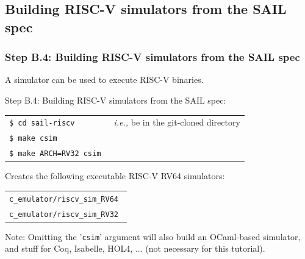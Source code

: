\documentclass[aspectratio=169]{beamer}
\newcommand{\hmmm}{\hspace*{3em}}
\begin{document}

\subsection{Building RISC-V simulators from the SAIL spec}


\begin{frame}
  \frametitle{Step B.4: Building RISC-V simulators from the SAIL spec}

  A simulator can be used to execute RISC-V binaries.

  \begin{block}{Step B.4: Building RISC-V simulators from the SAIL spec:}
    \scriptsize
    \begin{tabular}{ll}
      \tt \$ cd sail-riscv \hmmm & \emph{i.e.,} be in the git-cloned directory \\
      \tt \$ make  csim \\
      \tt \$ make  ARCH=RV32  csim
    \end{tabular}
  \end{block}

  \begin{block}{Creates the following executable RISC-V RV64 simulators:}
    \scriptsize
    \begin{tabular}{l}
      \tt c\_emulator/riscv\_sim\_RV64 \\
      \tt c\_emulator/riscv\_sim\_RV32
    \end{tabular}
  \end{block}

  {\tiny Note: Omitting the '{\tt csim}' argument will also build an OCaml-based
  simulator, and stuff for Coq, Isabelle, HOL4, ... (not necessary for
  this tutorial).}

\end{frame}

\end{document}
